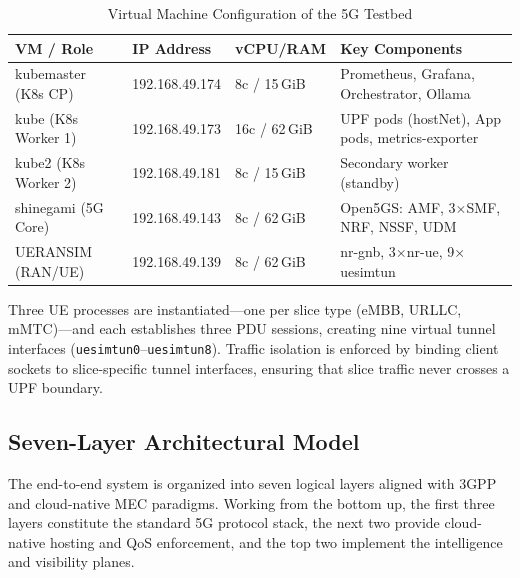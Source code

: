 \documentclass[12pt]{article}
\begin{document}
\begin{table}[H]
\centering
\caption{Virtual Machine Configuration of the 5G Testbed}
\label{tab:vms}
\begin{tabular}{@{}p{3.0cm}p{2.5cm}p{1.9cm}p{4.9cm}@{}}
\toprule
\textbf{VM / Role} & \textbf{IP Address} & \textbf{vCPU/RAM} &
\textbf{Key Components} \\
\midrule
kubemaster (K8s CP) & 192.168.49.174 & 8c / 15\,GiB &
  Prometheus, Grafana, Orchestrator, Ollama \\
kube (K8s Worker 1) & 192.168.49.173 & 16c / 62\,GiB &
  UPF pods (hostNet), App pods, metrics-exporter \\
kube2 (K8s Worker 2) & 192.168.49.181 & 8c / 15\,GiB &
  Secondary worker (standby) \\
shinegami (5G Core) & 192.168.49.143 & 8c / 62\,GiB &
  Open5GS: AMF, 3$\times$SMF, NRF, NSSF, UDM \\
UERANSIM (RAN/UE) & 192.168.49.139 & 8c / 62\,GiB &
  nr-gnb, 3$\times$nr-ue, 9$\times$uesimtun \\
\bottomrule
\end{tabular}
\end{table}

Three UE processes are instantiated---one per slice type (eMBB, URLLC,
mMTC)---and each establishes three PDU sessions, creating nine virtual
tunnel interfaces (\texttt{uesimtun0}--\texttt{uesimtun8}). Traffic
isolation is enforced by binding client sockets to slice-specific tunnel
interfaces, ensuring that slice traffic never crosses a UPF boundary.

\subsection{Seven-Layer Architectural Model}

The end-to-end system is organized into seven logical layers aligned with
3GPP and cloud-native MEC paradigms. Working from the bottom up, the
first three layers constitute the standard 5G protocol stack, the next
two provide cloud-native hosting and QoS enforcement, and the top two
implement the intelligence and visibility planes.
\end{document}
